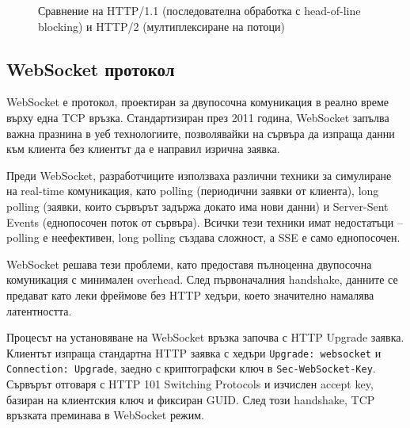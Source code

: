 \begin{figure}[H]
\caption{Сравнение на HTTP/1.1 (последователна обработка с head-of-line blocking) и HTTP/2 (мултиплексиране на потоци)}
\label{fig:http-comparison}
\end{figure}

\subsection{WebSocket протокол}

WebSocket \cite{rfc6455} е протокол, проектиран за двупосочна комуникация в реално време върху една TCP връзка. Стандартизиран през 2011 година, WebSocket запълва важна празнина в уеб технологиите, позволявайки на сървъра да изпраща данни към клиента без клиентът да е направил изрична заявка.

Преди WebSocket, разработчиците използваха различни техники за симулиране на real-time комуникация, като polling (периодични заявки от клиента), long polling (заявки, които сървърът задържа докато има нови данни) и Server-Sent Events (еднопосочен поток от сървъра). Всички тези техники имат недостатъци -- polling е неефективен, long polling създава сложност, а SSE е само еднопосочен.

WebSocket решава тези проблеми, като предоставя пълноценна двупосочна комуникация с минимален overhead. След първоначалния handshake, данните се предават като леки фреймове без HTTP хедъри, което значително намалява латентността.

Процесът на установяване на WebSocket връзка започва с HTTP Upgrade заявка. Клиентът изпраща стандартна HTTP заявка с хедъри \texttt{Upgrade: websocket} и \texttt{Connection: Upgrade}, заедно с криптографски ключ в \texttt{Sec-WebSocket-Key}. Сървърът отговаря с HTTP 101 Switching Protocols и изчислен accept key, базиран на клиентския ключ и фиксиран GUID. След този handshake, TCP връзката преминава в WebSocket режим.

